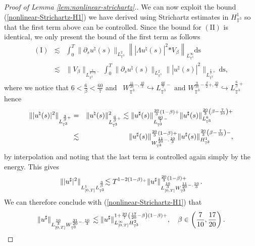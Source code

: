 \begin{proof}[Proof of Lemma \ref{lem:nonlinear-strichartz}.]
  We can now exploit the bound (\ref{nonlinear-Strichartz-H1}) we have
  derived using Strichartz estimates in $H_{\mathbb{T}^3}^1$ so that the first
  term above can be controlled. Since the bound for $(\mathrm{I} \mathrm{I})$ is
  identical, we only present the bound of the first term as follows
  \begin{eqnarray*}
    (\mathrm{I}) & \lesssim & \int^T_0 \| \partial_s u^{\natural} (s)
    \|_{L_{\mathbb{T}^3}^2} \left\| | \Lambda u^{\natural} (s) |^2 {\ast
    V_{\beta}}  \right\|_{L_{\mathbb{T}^3}^{\infty}} \mathrm{ds}\\
    & \lesssim & \| V_{\beta} \|_{L^{\frac{3}{3 - \beta} -}_{\mathbb{T}^3}}
    \int^T_0 \| \partial_s u^{\natural} (s) \|_{L_{\mathbb{T}^3}^2} \| |
    u^{\natural} (s) |^2 \|_{L_{\mathbb{T}^3}^{\frac{3}{\beta} +}} \mathrm{ds},
  \end{eqnarray*}
  where we notice that $6 < \frac{6}{\beta} < \frac{60}{7}$ and \
  $W_{\mathbb{T}^3}^{\frac{11}{20} -, \frac{10}{3}} \hookrightarrow
  L^{\frac{60}{7} -}_{\mathbb{T}^3}  \text{ and }
  W_{\mathbb{T}^3}^{\frac{9}{10} - \frac{\beta}{2} +, \frac{10}{3}}
  \hookrightarrow L_{\mathbb{T}^3}^{\frac{6}{\beta} +}$ hence
  \begin{eqnarray*}
   \| | u^{\natural} (s) |^2 \|_{L_{\mathbb{T}^3}^{\frac{3}{\beta} +}} & = & \|
     u^{\natural} (s) \|^2_{L^{\frac{6}{\beta} +}_{\mathbb{T}^3}} \lesssim \|
     u^{\sharp} (s) \|^{\frac{20}{3} (1 - \beta) +}_{L^{\frac{60}{7}
     -}_{\mathbb{T}^3}} \| u^{\sharp} (s) \|^{\frac{20}{3} \left( \beta -
     \frac{7}{10} \right) +}_{L^6_{\mathbb{T}^3}}\\
     & \lesssim& \| u^{\sharp} (s)
     \|^{{\color[HTML]{000000}\frac{20}{3} (1 - \beta)
     +}}_{W_{\mathbb{T}^3}^{\frac{11}{20} -, \frac{10}{3}}} \| u^{\sharp} (s)
     \|^{\frac{20}{3} \left( \beta - \frac{7}{10} \right)
     -}_{H^1_{\mathbb{T}^3}}, 
     \end{eqnarray*}
  by interpolation and noting that the last term is controlled again simply by
  the energy. This gives
  \begin{equation}
    \| | u^{\sharp} |^2 \|_{L_{[0, T]}^1 L_{\mathbb{T}^3}^{\frac{3}{\beta}}}
    {\lesssim T^{1 - 2 (1 - \beta)_+}}  \| u^{\sharp}
    \|^{{\color[HTML]{000000}\frac{20}{3} (1 - \beta) +}}_{L_{[0,
    T]}^{\frac{10}{3}} W_{\mathbb{T}^3}^{\frac{11}{20} -, \frac{10}{3}}} .
  \end{equation}
  We can therefore conclude with (\ref{nonlinear-Strichartz-H1}) that
  \begin{equation}
    \| u^{\sharp} \|_{L^{\frac{10}{3}}_{[0, T]}
    W_{\mathbb{T}^3}^{\frac{31}{20} -, \frac{10}{3}}} \lesssim \| u^{\sharp}
    \|^{1 + {\color[HTML]{000000}\frac{20}{7} \left(
    {\color[HTML]{000000}\frac{17}{20} - \beta} \right) (1 - \beta)}
    +}_{L_{[0, T]}^{\infty} H_{\mathbb{T}^3}^2}, \quad \beta \in \left(
    \frac{7}{10}, \frac{17}{20} \right) .
  \end{equation}
\end{proof}

